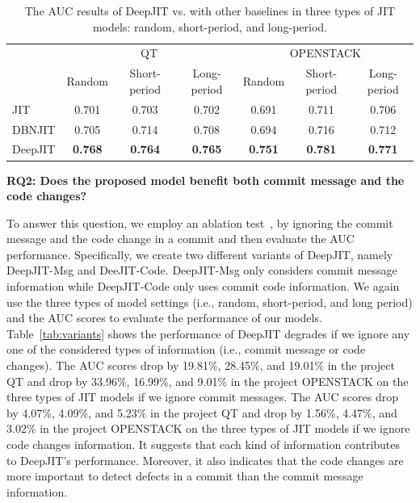 \begin{table}[t!]
	\centering
	\caption{The AUC results of DeepJIT vs. with other baselines in three types of JIT models: random, short-period, and long-period.}
	\begin{tabular}{|l|c|c|c|c|c|c|}
		\hline
		\multirow{2}[4]{*}{} & \multicolumn{3}{c|}{QT} & \multicolumn{3}{c|}{OPENSTACK} \\
		\cline{2-7}          & Random & Short-period & Long-period & Random & Short-period & Long-period \\
		\hline
		\hline
		JIT   & 0.701 & 0.703 & 0.702 & 0.691 & 0.711 & 0.706 \\
		\hline
		DBNJIT & 0.705 & 0.714 & 0.708 & 0.694 & 0.716 & 0.712 \\
		\hline
		DeepJIT & \textbf{0.768} & \textbf{0.764} & \textbf{0.765} & \textbf{0.751} & \textbf{0.781} & \textbf{0.771} \\
		\hline
	\end{tabular}%
	\label{tab:results}%
\end{table}%

\noindent \textbf{RQ2: Does the proposed model benefit both commit message and the code changes?}

To answer this question, we employ an ablation test~\cite{korbar2017deep, liu2017deep}, by ignoring the commit message and the code change in a commit and then evaluate the AUC performance. Specifically, we create two different variants of DeepJIT, namely DeepJIT-Msg and DeeJIT-Code. DeepJIT-Msg only considers commit message information while DeepJIT-Code only uses commit code information. We again use the three types of model settings (i.e., random, short-period, and long period) and the AUC scores to evaluate the performance of our models. Table~\ref{tab:variants} shows the performance of DeepJIT degrades if we ignore any one of the considered types of information (i.e., commit message or code changes). The AUC scores drop by 19.81\%, 28.45\%, and 19.01\% in the project QT and drop by 33.96\%, 16.99\%, and 9.01\% in the project OPENSTACK on the three types of JIT models if we ignore commit messages. The AUC scores drop by 4.07\%, 4.09\%, and 5.23\% in the project QT and drop by 1.56\%, 4.47\%, and 3.02\% in the project OPENSTACK on the three types of JIT models if we ignore code changes information. It suggests that each kind of information contributes to DeepJIT's performance. Moreover, it also indicates that the code changes are more important to detect defects in a commit than the commit message information.  


